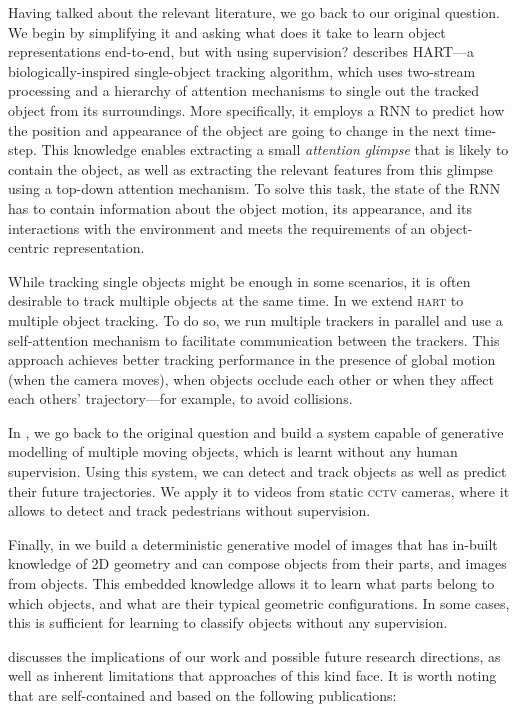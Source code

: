 Having talked about the relevant literature, we go back to our original question. 
We begin by simplifying it and asking what does it take to learn object representations end-to-end, but with using supervision?
 describes \textsc{HART}---a biologically-inspired single-object tracking algorithm, which uses two-stream processing and a hierarchy of attention mechanisms to single out the tracked object from its surroundings. 
More specifically, it employs a \gls{RNN} to predict how the position and appearance of the object are going to change in the next time-step. 
This knowledge enables extracting a small \textit{attention glimpse} that is likely to contain the object, as well as extracting the relevant features from this glimpse using a top-down attention mechanism.
To solve this task, the state of the \gls{RNN} has to contain information about the object motion, its appearance, and its interactions with the environment and meets the requirements of an object-centric representation.

While tracking single objects might be enough in some scenarios, it is often desirable to track multiple objects at the same time.
In  we extend \textsc{hart} to multiple object tracking.
To do so, we run multiple trackers in parallel and use a self-attention mechanism to facilitate communication between the trackers. This approach achieves better tracking performance in the presence of global motion (\!\eg when the camera moves), when objects occlude each other or when they affect each others' trajectory---for example, to avoid collisions. 

In , we go back to the original question and build a system capable of generative modelling of multiple moving objects, which is learnt without any human supervision. 
Using this system, we can detect and track objects as well as predict their future trajectories. 
We apply it to videos from static \textsc{cctv} cameras, where it allows to detect and track pedestrians without supervision.

Finally, in  we build a deterministic generative model of images that has in-built knowledge of 2D geometry and can compose objects from their parts, and images from objects.
This embedded knowledge allows it to learn what parts belong to which objects, and what are their typical geometric configurations.
In some cases, this is sufficient for learning to classify objects without any supervision.

 discusses the implications of our work and possible future research directions, as well as inherent limitations that approaches of this kind face. 
It is worth noting that  are self-contained and based on the following publications:


